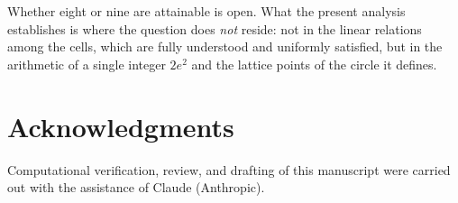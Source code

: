 \documentclass[12pt]{article}
\theoremstyle{remark}
\begin{document}
Whether eight or nine are attainable is open. What the present
analysis establishes is where the question does \emph{not} reside: not
in the linear relations among the cells, which are fully understood and
uniformly satisfied, but in the arithmetic of a single integer $2e^2$
and the lattice points of the circle it defines.

\section*{Acknowledgments}

Computational verification, review, and drafting of this manuscript
were carried out with the assistance of Claude (Anthropic).
\end{document}
